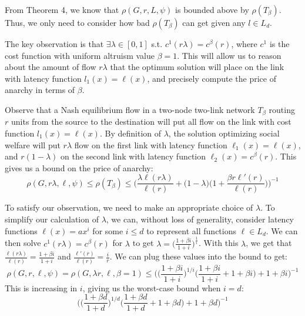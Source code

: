 \begin{proof-sketch}
From Theorem 4, we know that 
$\rho(G,r,{L},\psi)$%
    is bounded above by $\rho(T_\beta)$. Thus, we only need to consider how bad $\rho(T_\beta)$ can get given any $l\in L_d$.

    The key observation is that $\exists\lambda \in [0,1]$ s.t. $c^1(r\lambda) = c^\beta(r)$, where $c^1$ is the cost function with uniform altruism value $\beta=1$. This will allow us to reason about the amount of flow $r\lambda$ that the optimum solution will place on the link with latency function $l_1(x) = \ell(x)$, and precisely compute the price of anarchy in terms of $\beta$.

    Observe that a Nash equilibrium flow in a two-node two-link network $T_\beta$ routing $r$ units from the source to the destination will put all flow on the link with cost function $l_1(x) = \ell(x)$. By definition of $\lambda$, the solution optimizing social welfare will put $r\lambda$ flow on the first link with latency function $\ell_1(x) = \ell(x)$, and $r(1-\lambda)$ on the second link with latency function $\ell_2(x) = c^\beta(r)$. This gives us a bound on the price of anarchy:
    $$\rho(G,r\lambda,\ell,\psi) \le \rho(T_\beta) \le \Big(\frac{\lambda \ell(r\lambda)}{\ell(r)} + \Big(1-\lambda\Big)\Big(1+\frac{\beta r\ell'(r)}{\ell(r)}\Big)\Big)^{-1}$$

    To satisfy our observation, we need to make an appropriate choice of $\lambda$. To simplify our calculation of $\lambda$, we can, without loss of generality, consider latency functions $\ell(x) = ax^i$ for some $i \le d$ to represent all functions $\ell \in L_d$. We can then solve $c^1(r\lambda) = c^\beta(r)$ for $\lambda$ to get $\lambda = \Big(\frac{1+\beta i}{1+i}\Big)^{\frac{1}{i}}$.
    With this $\lambda$, we get that $\frac{\ell(r\lambda)}{\ell(r)} = \frac{1+\beta i}{1+i}$ and $\frac{\ell'(r)}{\ell(r)} = \frac{i}{r}$. We can plug these values into the bound to get:
    $$\rho(G,r,\ell,\psi) = \rho(G,\lambda r, \ell,\beta=1) \le \Big(\Big(\frac{1+\beta i}{1+i}\Big)^{1/i}\Big(\frac{1+\beta i}{1+i} + 1 + \beta i\Big)+ 1 + \beta i\Big)^{-1}$$
    This is increasing in $i$, giving us the worst-case bound when $i=d$:
$$\Big(\Big(\frac{1+\beta d}{1+d}\Big)^{1/d}\Big(\frac{1+\beta d}{1+d} + 1 + \beta d\Big)+ 1 + \beta d\Big)^{-1}$$
\end{proof-sketch}

